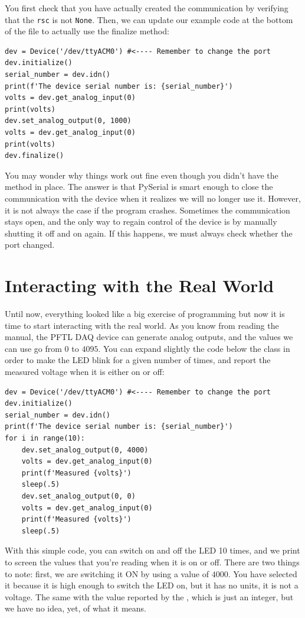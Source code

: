 You first check that you have actually created the communication by verifying that the \texttt{rsc} is not \texttt{None}. Then, we can update our example code at the bottom of the file to actually use the finalize method:

\begin{verbatim}
dev = Device('/dev/ttyACM0') #<---- Remember to change the port
dev.initialize()
serial_number = dev.idn()
print(f'The device serial number is: {serial_number}')
volts = dev.get_analog_input(0)
print(volts)
dev.set_analog_output(0, 1000)
volts = dev.get_analog_input(0)
print(volts)
dev.finalize()
\end{verbatim}

You may wonder why things work out fine even though you didn't have the  method in place. The answer is that PySerial is smart enough to close the communication with the device when it realizes we will no longer use it. However, it is not always the case if the program crashes. Sometimes the communication stays open, and the only way to regain control of the device is by manually shutting it off and on again. If this happens, we must always check whether the port changed.

\section{Interacting with the Real World}\label{sec:doing-something-in-theemph}
Until now, everything looked like a big exercise of programming but now it is time to start interacting with the real world. As you know from reading the manual, the {PFTL DAQ} device can generate analog outputs, and the values we can use go from $0$ to $4095$. You can expand slightly the code below the class in order to make the LED blink for a given number of times, and report the measured voltage when it is either on or off:

\begin{verbatim}
dev = Device('/dev/ttyACM0') #<---- Remember to change the port
dev.initialize()
serial_number = dev.idn()
print(f'The device serial number is: {serial_number}')
for i in range(10):
    dev.set_analog_output(0, 4000)
    volts = dev.get_analog_input(0)
    print(f'Measured {volts}')
    sleep(.5)
    dev.set_analog_output(0, 0)
    volts = dev.get_analog_input(0)
    print(f'Measured {volts}')
    sleep(.5)
\end{verbatim}

With this simple code, you can switch on and off the LED 10 times, and we print to screen the values that you're reading when it is on or off. There are two things to note: first, we are switching it ON by using a value of $4000$. You have selected it because it is high enough to switch the LED on, but it has no units, it is not a voltage. The same with the value reported by the , which is just an integer, but we have no idea, yet, of what it means.

